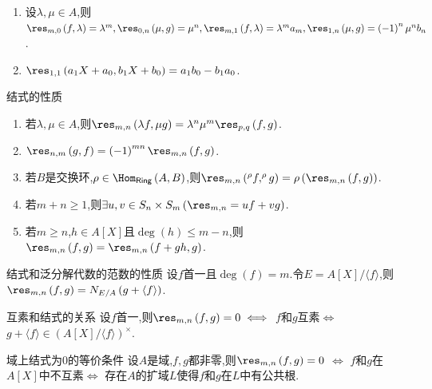 \begin{example}{}{}
	\begin{enumerate}
		\item 设$\lambda,\mu\in A$,则$\res_{m,0}\left(f,\lambda\right)=\lambda^{m},\res_{0,n}\left(\mu,g\right)=\mu^{n},\res_{m,1}\left(f,\lambda\right)=\lambda^{m}a_{m},\res_{1,n}\left(\mu,g\right)=\left(-1\right)^{n}\mu^{n}b_{n}$.
		\item $\res_{1,1}\left(a_{1}X+a_{0},b_{1}X+b_{0}\right)=a_{1}b_{0}-b_{1}a_{0}$.
	\end{enumerate}
\end{example}

\begin{proposition}{结式的性质}{}
	\begin{enumerate}
		\item 若$\lambda,\mu\in A$,则$\res_{m,n}\left(\lambda f,\mu g\right)=\lambda^{n}\mu^{m}\res_{p,q}\left(f,g\right)$.
		\item $\res_{n,m}\left(g,f\right)=\left(-1\right)^{mn}\res_{m,n}\left(f,g\right)$.
		\item 若$B$是交换环,$\rho\in\Hom_{\mathsf{Ring}}\left(A,B\right)$,则$\res_{m,n}\left(^{\rho}f,^{\rho}g\right)=\rho\left(\res_{m,n}\left(f,g\right)\right)$.
		\item 若$m+n\geq 1$,则$\exists u,v\in S_{n}\times S_{m}\left(\res_{m,n}=uf+vg\right)$.
		\item 若$m\geq n$,$h\in A[X]$且$\deg\left(h\right)\leq m-n$,则$\res_{m,n}\left(f,g\right)=\res_{m,n}\left(f+gh,g\right)$.
	\end{enumerate}
\end{proposition}

\begin{proposition}{结式和泛分解代数的范数的性质}{}
	设$f$首一且$\deg\left(f\right)=m$.令$E=A[X]/\langle f\rangle$,则$\res_{m,n}\left(f,g\right)=N_{E/A}\left(g+\langle f\rangle\right)$.
\end{proposition}

\begin{corollary}{互素和结式的关系}{}
	设$f$首一,则$\res_{m,n}\left(f,g\right)=0\iff$ $f$和$g$互素$\iff$ $g+\langle f\rangle\in\left(A[X]/\langle f\rangle\right)^{\times}$.
\end{corollary}

\begin{corollary}{域上结式为$0$的等价条件}{}
	设$A$是域,$f,g$都非零,则$\res_{m,n}\left(f,g\right)=0$ $\iff$ $f$和$g$在$A[X]$中不互素$\iff$ 存在$A$的扩域$L$使得$f$和$g$在$L$中有公共根.
\end{corollary}

